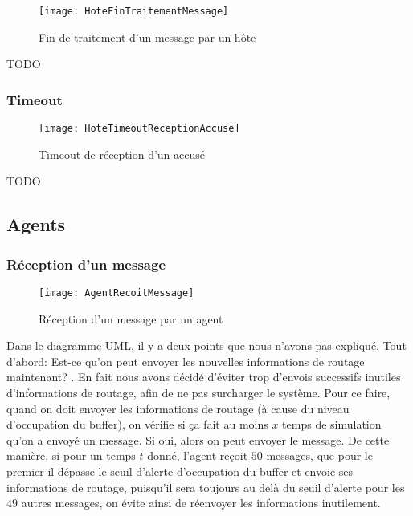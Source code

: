 \documentclass[a4paper,11pt]{article}
\begin{document}
\begin{figure}[h!t]
  \centering
    \texttt{[image: HoteFinTraitementMessage]}
  \caption{Fin de traitement d'un message par un hôte}
  \label{fig:hote-fin-traitement-message}
\end{figure}

TODO

\subsubsection{Timeout}

\begin{figure}[h!t]
  \centering
    \texttt{[image: HoteTimeoutReceptionAccuse]}
  \caption{Timeout de réception d'un accusé}
  \label{fig:hote-timeout}
\end{figure}

TODO



\subsection{Agents}
\subsubsection{Réception d'un message}\label{evt-agent-reception-message}

\begin{figure}[h!t]
  \centering
    \texttt{[image: AgentRecoitMessage]}
  \caption{Réception d'un message par un agent}
  \label{fig:agent-recoit-message}
\end{figure}

Dans le diagramme UML, il y a deux points que nous n'avons pas expliqué. Tout d'abord: \og Est-ce qu'on peut envoyer les nouvelles informations de routage maintenant? \fg. En fait nous avons décidé d'éviter trop d'envois successifs inutiles d'informations de routage, afin de ne pas surcharger le système. Pour ce faire, quand on doit envoyer les informations de routage (à cause du niveau d'occupation du buffer), on vérifie si ça fait au moins $x$ temps de simulation qu'on a envoyé un message. Si oui, alors on peut envoyer le message. De cette manière, si pour un temps $t$ donné, l'agent reçoit $50$ messages, que pour le premier il dépasse le seuil d'alerte d'occupation du buffer et envoie ses informations de routage, puisqu'il sera toujours au delà du seuil d'alerte pour les $49$ autres messages, on évite ainsi de réenvoyer les informations inutilement.
\end{document}
